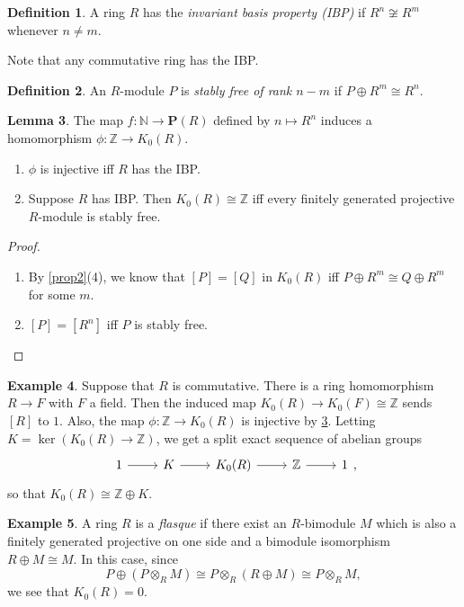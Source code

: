 \documentclass[10pt,letterpaper,cm]{nupset}
\theoremstyle{definition}
\newtheorem{definition}{Definition}[section]
\newtheorem{exmp}[definition]{Example}
\theoremstyle{theorem}
\newtheorem{lemma}[definition]{Lemma}
\theoremstyle{remark}
\newcommand{\N}{\mathbb N}
\renewcommand{\P}{\mathbf P}
\newcommand{\Z}{\mathbb Z}
\newcommand{\1}{\mathbf{1}}
\newcommand{\0}{\vec 0}
\begin{document}
\begin{definition}
A ring $R$ has the \textit{invariant basis property (IBP)} if $R^n \not \cong R^m$ whenever $n \ne m$. 
\end{definition}

Note that any commutative ring has the IBP.

\begin{definition}
An $R$-module $P$ is \textit{stably free of rank $n-m$} if $P \oplus R^m \cong R^n$.
\end{definition}

\begin{lemma}\label{L4}
The map $f: \N \to \P(R)$ defined by $n \mapsto R^n$ induces a homomorphism $\phi : \Z \to K_0(R)$.
\begin{enumerate}
\item $\phi$ is injective iff $R$ has the IBP.
\item Suppose $R$ has IBP. Then $K_0(R) \cong \Z$ iff every finitely generated projective $R$-module is stably free.
\end{enumerate}
\end{lemma}
\begin{proof} $ $
\begin{enumerate}
\item By \cref{prop2}(4), we know that $\left[P\right] = \left[Q\right]$ in $K_0(R)$ iff $P\oplus R^m \cong Q\oplus R^m$ for some $m$. 
\item $\left[P\right]= \left[R^n\right]$ iff $P$ is stably free.
\end{enumerate}
\end{proof}


\begin{exmp}
Suppose that $R$ is commutative. There is a ring homomorphism $R\to F$ with $F$ a field. Then the induced map $K_0(R) \to K_0(F) \cong \Z$ sends $[R]$ to $1$. Also, the map $\phi : \Z \to K_0(R)$ is injective by \cref{L4}. Letting $K= \ker(K_0(R) \to \Z)$, we get a split exact sequence of abelian groups
\[
\begin{tikzcd}
1 \arrow[r] & K \arrow[r] & K_0(R) \arrow[r] & \mathbb Z \arrow[r] & 1
\end{tikzcd},
\]
so that $K_0(R) \cong \Z \oplus K$.
\end{exmp}

\begin{exmp}
A ring $R$ is a \textit{flasque} if there exist an $R$-bimodule $M$ which is also a finitely generated projective on one side and a bimodule isomorphism $R\oplus M \cong M$. In this case, since $$P \oplus \left(P \otimes_R M\right) \cong P \otimes_R \left(R \oplus M\right) \cong P \otimes_R M,$$ we see that $K_0(R) =0$.
\end{exmp}
\end{document}
